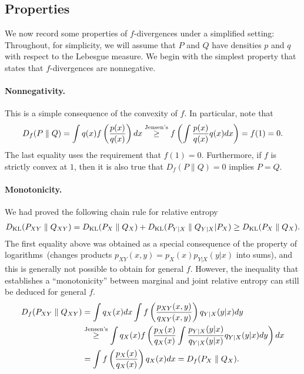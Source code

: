 \documentclass[12pt]{article}
\begin{document}
\subsection{Properties}
\label{subsec:properties-f-divs}
We now record some properties of $f$-divergences under a simplified setting: Throughout, for simplicity, we will assume that $P$ and $Q$ have densities $p$ and $q$ with respect to the Lebesgue measure. We begin with the simplest property that states that $f$-divergences are nonnegative. 

\paragraph{Nonnegativity.} This is a simple consequence of the convexity of $f$. In particular, note that 
\begin{align}
D_f(P \parallel Q) = \int q(x) f \left( \frac{p(x)}{q(x)} \right) dx \stackrel{\text{Jensen's}}{\geq} f \left( \int \frac{p(x)}{q(x)} q(x)dx  \right) = f(1) = 0. 
\end{align}
The last equality uses the requirement that $f(1)=0$. Furthermore, if $f$ is strictly convex at $1$, then it is also true that $D_f(P\parallel Q) = 0$ implies $P=Q$. 

\paragraph{Monotonicity.} We had proved the following chain rule for relative entropy 
\begin{align}
D_{\text{KL}}(P_{XY} \parallel Q_{XY}) = D_{\text{KL}}(P_X \parallel Q_X) + D_{\text{KL}}(P_{Y|X} \parallel Q_{Y|X}| P_X) \geq D_{\text{KL}}(P_X \parallel Q_X). 
\end{align}
The first equality above was obtained as a special consequence of the property of logarithms~(changes products $p_{XY}(x,y) = p_X(x) p_{Y|X}(y|x)$ into sums), and this is generally not possible to obtain for general $f$. However, the inequality that establishes a ``monotonicity'' between marginal and joint relative entropy can still be deduced for general $f$. 
\begin{align}
D_f(P_{XY} \parallel Q_{XY}) &= \int q_X(x)dx \int f\left( \frac{p_{XY}(x,y)}{q_{XY}(x,y)} \right) q_{Y|X}(y|x)dy \\ 
& \stackrel{\text{Jensen's}}{\geq} \int q_X(x) f\left( \frac{p_{X}(x) }{q_{X}(x)} \int \frac{p_{Y|X}(y|x)}{q_{Y|X}(y|x)} q_{Y|X}(y|x) dy \right)  dx \\ 
&= \int f\left( \frac{p_X(x)}{q_X(x)} \right) q_X(x) dx =  D_f(P_{X} \parallel Q_{X}). 
\end{align}
\end{document}
